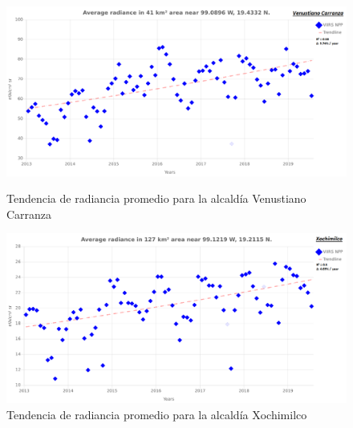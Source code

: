 \begin{figure}[H]
  \centering
    \includegraphics[width=1\textwidth]{VC}
  \caption{Tendencia de radiancia promedio para la alcaldía Venustiano Carranza}
  \label{radiancetrendstlah}
\vspace{20mm} 
    \includegraphics[width=1\textwidth]{XO}
  \caption{Tendencia de radiancia promedio para la alcaldía Xochimilco}
  \label{radiancetrendstla}
\end{figure}
\blindtext

\newpage